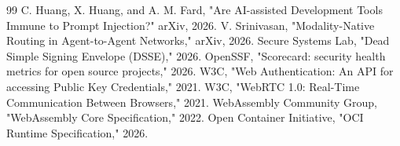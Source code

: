 \documentclass[journal,onecolumn]{IEEEtran}
\begin{document}
\begin{thebibliography}{99}
 C. Huang, X. Huang, and A. M. Fard, "Are AI-assisted Development Tools Immune to Prompt Injection?" arXiv, 2026.
 V. Srinivasan, "Modality-Native Routing in Agent-to-Agent Networks," arXiv, 2026.
 Secure Systems Lab, "Dead Simple Signing Envelope (DSSE)," 2026.
 OpenSSF, "Scorecard: security health metrics for open source projects," 2026.
 W3C, "Web Authentication: An API for accessing Public Key Credentials," 2021.
 W3C, "WebRTC 1.0: Real-Time Communication Between Browsers," 2021.
 WebAssembly Community Group, "WebAssembly Core Specification," 2022.
 Open Container Initiative, "OCI Runtime Specification," 2026.
\end{thebibliography}
\end{document}
